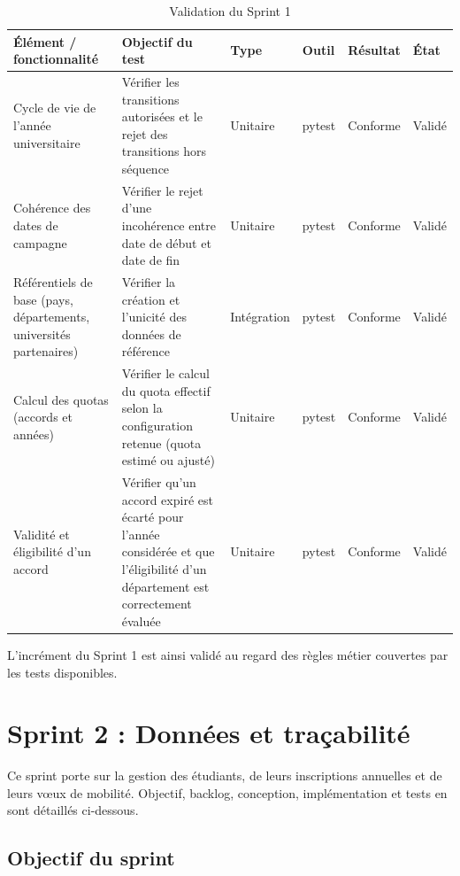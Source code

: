 \renewcommand{\arraystretch}{1.3}
\begin{table}[H]
\centering
\caption{Validation du Sprint 1}
\label{tab:validation-sprint1}
\footnotesize
\begin{tabular}{|p{2.8cm}|p{4.6cm}|p{1.5cm}|p{1.4cm}|p{1.8cm}|p{1.4cm}|}
\hline
\rowcolor{gray!20}
\textbf{Élément / fonctionnalité} & \textbf{Objectif du test} & \textbf{Type} & \textbf{Outil} & \textbf{Résultat} & \textbf{État} \\
\hline
Cycle de vie de l'année universitaire &
Vérifier les transitions autorisées et le rejet des transitions hors séquence &
Unitaire & pytest & Conforme & Validé \\
\hline
Cohérence des dates de campagne &
Vérifier le rejet d'une incohérence entre date de début et date de fin &
Unitaire & pytest & Conforme & Validé \\
\hline
Référentiels de base (pays, départements, universités partenaires) &
Vérifier la création et l'unicité des données de référence &
Intégration & pytest & Conforme & Validé \\
\hline
Calcul des quotas (accords et années) &
Vérifier le calcul du quota effectif selon la configuration retenue (quota estimé ou ajusté) &
Unitaire & pytest & Conforme & Validé \\
\hline
Validité et éligibilité d'un accord &
Vérifier qu'un accord expiré est écarté pour l'année considérée et que l'éligibilité d'un département est correctement évaluée &
Unitaire & pytest & Conforme & Validé \\
\hline
\end{tabular}
\end{table}

L'incrément du Sprint 1 est ainsi validé au regard des règles métier couvertes par les tests disponibles.


\section{Sprint 2 : Données et traçabilité}

Ce sprint porte sur la gestion des étudiants, de leurs inscriptions annuelles et de leurs vœux de mobilité. Objectif, backlog, conception, implémentation et tests en sont détaillés ci-dessous.

\subsection{Objectif du sprint}

